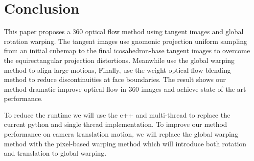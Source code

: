 \section{Conclusion}

This paper proposes a 360 optical flow method using tangent images and global rotation warping.
The tangent images use gnomonic projection uniform sampling from an initial cubemap to the final icosahedron-base tangent images to overcome the equirectangular projection distortions. Meanwhile use the global warping method to align large motions, 
Finally, use the weight optical flow blending method to reduce discontinuities at face boundaries.
%
The result shows our method dramatic improve optical flow in 360 images and achieve state-of-the-art performance.

To reduce the runtime we will use the c++ and multi-thread to replace the current python and single thread implementation.
To improve our method performance on camera translation motion, we will replace the global warping method with the pixel-based warping method which will introduce both rotation and translation to global warping.